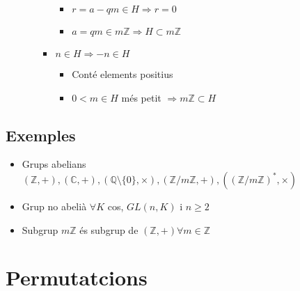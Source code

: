 \documentclass{article}
\newcommand{\Z}{\mathbb{Z}}
\newcommand{\Q}{\mathbb{Q}}
\newcommand{\C}{\mathbb{C}}
\begin{document}
\begin{itemize}
\begin{itemize}
\begin{itemize}
\begin{itemize}
			\item $r = a - qm \in H \Rightarrow r = 0$
			\item $a = qm \in m\Z \Rightarrow H \subset m\Z$
			\end{itemize}
		\item $n \in H \Rightarrow -n \in H$
			\begin{itemize}
			\item Conté elements positius
			\item $0 < m \in H$ més petit $\Rightarrow m\Z \subset H$
			\end{itemize}
		\end{itemize}
	\end{itemize}
\end{itemize}

\subsection{Exemples}
\begin{itemize}
\item Grups abelians
	\subitem $(\Z, +), (\C, +), (\Q\setminus\{0\}, \times), (\Z/m\Z, +), ((\Z/m\Z)^*, \times)$
\item Grup no abelià
	\subitem $\forall K$ cos, $GL(n, K)$ i $n \ge 2$
\item Subgrup
	\subitem $m\Z$ és subgrup de $(\Z, +) \forall m \in \Z$
\end{itemize}


\section{Permutatcions}
\end{document}
